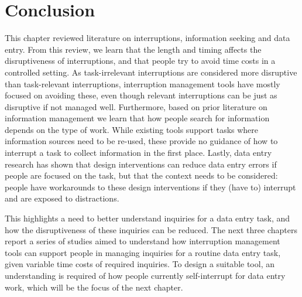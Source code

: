 \section{Conclusion}
This chapter reviewed literature on interruptions, information seeking and data entry. From this review, we learn that the length and timing affects the disruptiveness of interruptions, and that people try to avoid time costs in a controlled setting. As task-irrelevant interruptions are considered more disruptive than task-relevant interruptions, interruption management tools have mostly focused on avoiding these, even though relevant interruptions can be just as disruptive if not managed well. Furthermore, based on prior literature on information management we learn that how people search for information depends on the type of work. While existing tools support tasks where information sources need to be re-used, these provide no guidance of how to interrupt a task to collect information in the first place. Lastly, data entry research has shown that design interventions can reduce data entry errors if people are focused on the task, but that the context needs to be considered: people have workarounds to these design interventions if they (have to) interrupt and are exposed to distractions.

This highlights a need to better understand inquiries for a data entry task, and how the disruptiveness of these inquiries can be reduced. The next three chapters report a series of studies aimed to understand how interruption management tools can support people in managing inquiries for a routine data entry task, given variable time costs of required inquiries. To design a suitable tool, an understanding is required of how people currently self-interrupt for data entry work, which will be the focus of the next chapter.



